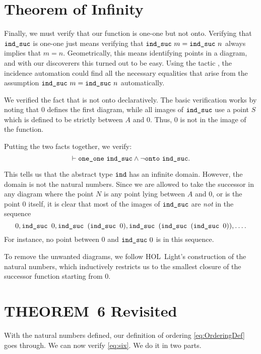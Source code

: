\section{Theorem of Infinity}
Finally, we must verify that our function is one-one but not onto. Verifying that $\texttt{ind\_suc}$ is one-one just means verifying that $\texttt{ind\_suc}\ m = \texttt{ind\_suc}\ n$ always implies that \mbox{$m = n$}. Geometrically, this means identifying points in a diagram, and with our discoverers this turned out to be easy. Using the tactic , the incidence automation could find all the necessary equalities that arise from the assumption $\texttt{ind\_suc}\ m = \texttt{ind\_suc}\ n$ automatically.

We verified the fact that  is not onto declaratively. The basic verification works by noting that $0$ defines the first diagram, while all images of $\texttt{ind\_suc}$ use a point $S$ which is defined to be strictly between $A$ and $0$. Thus, $0$ is not in the image of the function. 

Putting the two facts together, we verify:
\begin{equation*}
\vdash\texttt{one\_one}\ \texttt{ind\_suc} \wedge \neg\texttt{onto}\ \texttt{ind\_suc}.
\end{equation*}

This tells us that the abstract type $\texttt{ind}$ has an infinite domain. However, the domain is not the natural numbers. Since we are allowed to take the successor in any diagram where the point $N$ is any point lying between $A$ and $0$, or is the point $0$ itself, it is clear that most of the images of $\texttt{ind\_suc}$ are \emph{not} in the sequence
\begin{displaymath}
0, \texttt{ind\_suc } 0, \texttt{ind\_suc }(\texttt{ind\_suc } 0), \texttt{ind\_suc }(\texttt{ind\_suc }(\texttt{ind\_suc } 0)),  \ldots.
\end{displaymath}
For instance, no point between $0$ and $\texttt{ind\_suc}\ 0$ is in this sequence.

To remove the unwanted diagrams, we follow HOL~Light's construction of the natural numbers, which inductively restricts us to the smallest closure of the successor function starting from $0$. 

\section{THEOREM~6 Revisited}
With the natural numbers defined, our definition of ordering \eqref{eq:OrderingDef} goes through. We can now verify \ref{eq:six}. We do it in two parts.

